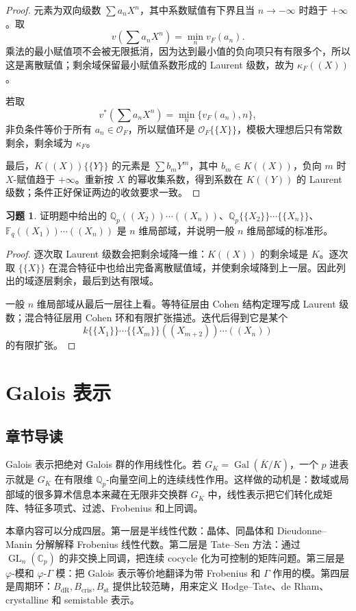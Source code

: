 \documentclass[11pt,a4paper,openany]{ctexbook}
\numberwithin{equation}{chapter}
\newcommand{\Q}{\mathbb{Q}}
\newcommand{\C}{\mathbb{C}}
\newcommand{\F}{\mathbb{F}}
\newcommand{\Gal}{\operatorname{Gal}}
\newcommand{\GL}{\operatorname{GL}}
\theoremstyle{plain}
\theoremstyle{definition}
\newtheorem{exercise}[theorem]{习题}
\theoremstyle{remark}
\begin{document}
\begin{proof}
元素为双向级数 $\sum a_nX^n$，其中系数赋值有下界且当 $n\to-\infty$ 时趋于 $+\infty$。取
\[
  v\left(\sum a_nX^n\right)=\min_n v_F(a_n).
\]
乘法的最小赋值项不会被无限抵消，因为达到最小值的负向项只有有限多个，所以这是离散赋值；剩余域保留最小赋值系数形成的 Laurent 级数，故为 $\kappa_F((X))$。

若取
\[
  v^*\left(\sum a_nX^n\right)=\min_n\{v_F(a_n),n\},
\]
非负条件等价于所有 $a_n\in\mathcal O_F$，所以赋值环是 $\mathcal O_F\{\{X\}\}$，模极大理想后只有常数剩余，剩余域为 $\kappa_F$。

最后，$K((X))\{\{Y\}\}$ 的元素是 $\sum b_mY^m$，其中 $b_m\in K((X))$，负向 $m$ 时 $X$-赋值趋于 $+\infty$。重新按 $X$ 的幂收集系数，得到系数在 $K((Y))$ 的 Laurent 级数；条件正好保证两边的收敛要求一致。
\end{proof}

\begin{exercise}
证明题中给出的 $\Q_p((X_2))\cdots((X_n))$、$\Q_p\{\{X_2\}\}\cdots\{\{X_n\}\}$、$\F_q((X_1))\cdots((X_n))$ 是 $n$ 维局部域，并说明一般 $n$ 维局部域的标准形。
\end{exercise}

\begin{proof}
逐次取 Laurent 级数会把剩余域降一维：$K((X))$ 的剩余域是 $K$。逐次取 $\{\{X\}\}$ 在混合特征中也给出完备离散赋值域，并使剩余域降到上一层。因此列出的域逐层剩余，最后到达有限域。

一般 $n$ 维局部域从最后一层往上看。等特征层由 Cohen 结构定理写成 Laurent 级数；混合特征层用 Cohen 环和有限扩张描述。迭代后得到它是某个
\[
  k\{\{X_1\}\}\cdots\{\{X_m\}\}((X_{m+2}))\cdots((X_n))
\]
的有限扩张。
\end{proof}
 \chapter{Galois 表示}

\section{章节导读}

Galois 表示把绝对 Galois 群的作用线性化。若 $G_K=\Gal(\overline K/K)$，一个 $p$ 进表示就是 $G_K$ 在有限维 $\Q_p$-向量空间上的连续线性作用。这样做的动机是：数域或局部域的很多算术信息本来藏在无限非交换群 $G_K$ 中，线性表示把它们转化成矩阵、特征多项式、过滤、Frobenius 和上同调。

本章内容可以分成四层。第一层是半线性代数：晶体、同晶体和 Dieudonne--Manin 分解解释 Frobenius 线性代数。第二层是 Tate--Sen 方法：通过 $\GL_n(\C_p)$ 的非交换上同调，把连续 cocycle 化为可控制的矩阵问题。第三层是 $\varphi$-模和 $\varphi$-$\Gamma$ 模：把 Galois 表示等价地翻译为带 Frobenius 和 $\Gamma$ 作用的模。第四层是周期环：$B_{\mathrm{dR}},B_{\mathrm{cris}},B_{\mathrm{st}}$ 提供比较范畴，用来定义 Hodge--Tate、de Rham、crystalline 和 semistable 表示。
\end{document}
